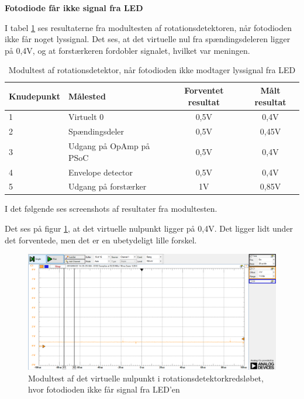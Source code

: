 \noindent \textbf{Fotodiode får ikke signal fra LED}

\noindent I tabel \ref{dioderIkkeSe} ses resultaterne fra modultesten af rotationsdetektoren, når fotodioden ikke får noget lyssignal. Det ses, at det virtuelle nul fra spændingsdeleren ligger på 0,4V, og at forstærkeren fordobler signalet, hvilket var meningen. 

\begin{table}[H]
	\centering
	\begin{tabular}{|l|l|c|c|}
		\hline
		\textbf{Knudepunkt}		& \textbf{Målested}       & \textbf{Forventet resultat} & \textbf{Målt resultat} \\ \hline
		1						& Virtuelt 0              & 0,5V                        & 0,4V                   \\ \hline
		2						& Spændingsdeler          & 0,5V                        & 0,45V                  \\ \hline
		3						& Udgang på OpAmp på PSoC & 0,5V                        & 0,4V                   \\ \hline
		4 						& Envelope detector       & 0,5V                        & 0,4V                   \\ \hline
		5 						& Udgang på forstærker    & 1V                          & 0,85V                  \\ \hline
	\end{tabular}
	\caption{Modultest af rotationsdetektor, når fotodioden ikke modtager lyssignal fra LED}
	\label{dioderIkkeSe}
\end{table}

\noindent I det følgende ses screenshots af resultater fra modultesten. 

\noindent Det ses på figur \ref{fig:virt0IkkeSe}, at det virtuelle nulpunkt ligger på 0,4V. Det ligger lidt under det forventede, men det er en ubetydeligt lille forskel. 

\begin{figure}[H]
	\centering
	\includegraphics[width=\textwidth]{Test/images/AffyringTest/IkkeSe/virtuelt_nul}
	\caption{Modultest af det virtuelle nulpunkt i rotationsdetektorkredsløbet, hvor fotodioden ikke får signal fra LED'en}
	\label{fig:virt0IkkeSe}
\end{figure}

